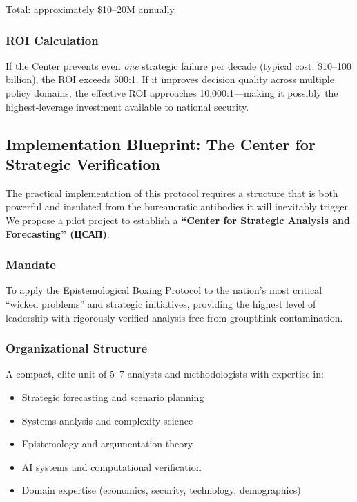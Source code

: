 \documentclass[11pt,a4paper]{article}
\begin{document}
\begin{small}
\noindent Total: approximately \$10--20M annually.

\subsubsection{ROI Calculation}
If the Center prevents even \textit{one} strategic failure per decade (typical cost: \$10--100 billion), the ROI exceeds 500:1. If it improves decision quality across multiple policy domains, the effective ROI approaches 10,000:1—making it possibly the highest-leverage investment available to national security.

\subsection{Implementation Blueprint: The Center for Strategic Verification}
The practical implementation of this protocol requires a structure that is both powerful and insulated from the bureaucratic antibodies it will inevitably trigger. We propose a pilot project to establish a \textbf{``Center for Strategic Analysis and Forecasting'' (ЦСАП)}.

\subsubsection{Mandate}
To apply the Epistemological Boxing Protocol to the nation's most critical ``wicked problems'' and strategic initiatives, providing the highest level of leadership with rigorously verified analysis free from groupthink contamination.

\subsubsection{Organizational Structure}
\begin{description}[style=nextline]
    \item[\textbf{Core Team}] A compact, elite unit of 5--7 analysts and methodologists with expertise in:
    \begin{itemize}[nosep]
        \item Strategic forecasting and scenario planning
        \item Systems analysis and complexity science
        \item Epistemology and argumentation theory
        \item AI systems and computational verification
        \item Domain expertise (economics, security, technology, demographics)
    \end{itemize}
    

\end{description}
\end{small}
\end{document}
